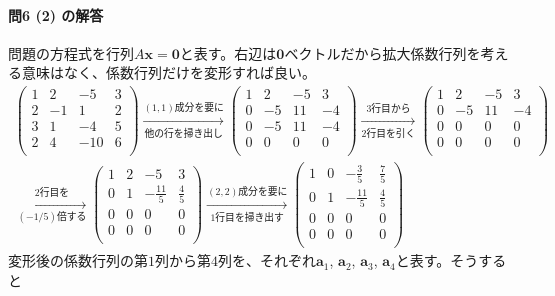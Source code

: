 \paragraph{問6 (2) の解答}
問題の方程式を行列$A\bm{x} = \bm{0}$と表す。右辺は$\bm{0}$ベクトルだから拡大係数行列を考える意味はなく、係数行列だけを変形すれば良い。
\begin{align*}
\left(
\begin{array}{rrrr}
1 & 2 & -5 & 3 \\
2 & -1 & 1 & 2 \\
3 & 1 & -4 & 5 \\
2 & 4 & -10 & 6 \\
\end{array}
\right)
\xrightarrow[\text{他の行を掃き出し}]{\text{$(1, 1)$成分を要に}}
\left(
\begin{array}{rrrr}
1 & 2 & -5 & 3 \\
0 & -5 & 11 & -4 \\
0 & -5 & 11 & -4 \\
0 & 0 & 0 & 0 \\
\end{array}
\right)
\xrightarrow[\text{$2$行目を引く}]{\text{$3$行目から}}
\left(
\begin{array}{rrrr}
1 & 2 & -5 & 3 \\
0 & -5 & 11 & -4\\
0 & 0 & 0 & 0 \\
0 & 0 & 0 & 0 \\
\end{array}
\right) \\
\xrightarrow[\text{$(-1/5)$倍する}]{\text{$2$行目を}}
\left(
\begin{array}{rrrr}
1 & 2 & -5 & 3 \\
0 & 1 & -\frac{11}{5} & \frac{4}{5} \\
0 & 0 & 0 & 0 \\
0 & 0 & 0 & 0 \\
\end{array}
\right)
\xrightarrow[\text{$1$行目を掃き出す}]{\text{$(2, 2)$成分を要に}}
\left(
\begin{array}{rrrr}
1 & 0 & -\frac{3}{5} & \frac{7}{5} \\
0 & 1 & -\frac{11}{5} & \frac{4}{5} \\
0 & 0 & 0 & 0 \\
0 & 0 & 0 & 0 \\
\end{array}
\right)
\end{align*}
変形後の係数行列の第$1$列から第$4$列を、それぞれ$\bm{a}_1$, $\bm{a}_2$, $\bm{a}_3$, $\bm{a}_4$と表す。そうすると
